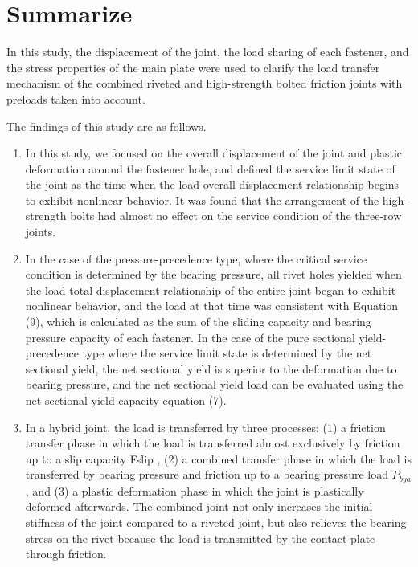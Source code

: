 \section{Summarize}

In this study, the displacement of the joint, the load sharing of each fastener, and the stress properties of the main plate were used to clarify the load transfer mechanism of the combined riveted and high-strength bolted friction joints with preloads taken into account.

The findings of this study are as follows.

\begin{enumerate}
    \item In this study, we focused on the overall displacement of the joint and plastic deformation around the fastener hole, and defined the service limit state of the joint as the time when the load-overall displacement relationship begins to exhibit nonlinear behavior. It was found that the arrangement of the high-strength bolts had almost no effect on the service condition of the three-row joints.

    \item  In the case of the pressure-precedence type, where the critical service condition is determined by the bearing pressure, all rivet holes yielded when the load-total displacement relationship of the entire joint began to exhibit nonlinear behavior, and the load at that time was consistent with Equation (9), which is calculated as the sum of the sliding capacity and bearing pressure capacity of each fastener. In the case of the pure sectional yield-precedence type where the service limit state is determined by the net sectional yield, the net sectional yield is superior to the deformation due to bearing pressure, and the net sectional yield load can be evaluated using the net sectional yield capacity equation (7).

    \item  In a hybrid joint, the load is transferred by three processes: (1) a friction transfer phase in which the load is transferred almost exclusively by friction up to a slip capacity Fslip , (2) a combined transfer phase in which the load is transferred by bearing pressure and friction up to a bearing pressure load $P_{bya}$ , and (3) a plastic deformation phase in which the joint is plastically deformed afterwards. The combined joint not only increases the initial stiffness of the joint compared to a riveted joint, but also relieves the bearing stress on the rivet because the load is transmitted by the contact plate through friction.


\end{enumerate}
